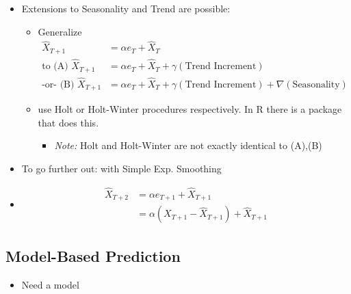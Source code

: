 \begin{itemize}
\begin{itemize}
    \end{itemize}
    \item Extensions to Seasonality and Trend are possible:
    \begin{itemize}
        \item Generalize 
        \begin{align*}
            \hat{X}_{T+1} &= \alpha e_T+\hat{X}_T\\
            \text{to (A) } \hat{X}_{T+1}&= \alpha e_T+\hat{X}_T+\gamma(\text{Trend Increment}) \\
            \text{-or- (B) } \hat{X}_{T+1}&= \alpha e_T+\hat{X}_T+\gamma(\text{Trend Increment}) + \nabla(\text{Seasonality})
        \end{align*}
        \item use Holt or Holt-Winter procedures respectively. In R there is a package that does this.
        \begin{itemize}
            \item[] \textit{Note:} Holt and Holt-Winter are not exactly identical to (A),(B)
        \end{itemize}
    \end{itemize}
    \item To go further out: \quad with Simple Exp. Smoothing\\

    \item {} 
    \begin{align*}
        \hat{X}_{T+2} &= \alpha e_{T+1} + \hat{X}_{T+1}\\
        &= \alpha(X_{T+1}-\hat{X}_{T+1})+\hat{X}_{T+1}
    \end{align*}
\end{itemize}

\subsection{Model-Based Prediction}

\begin{itemize}
    \item Need a model
\end{itemize}


